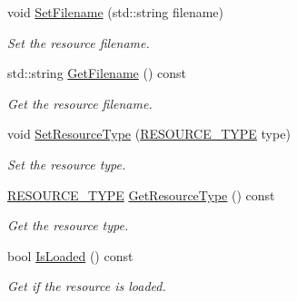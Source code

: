 \begin{DoxyCompactItemize}
void \mbox{\hyperlink{classsfmlbe_1_1_resource_a219b033dc969ca0860bf7402da27107d}{Set\+Filename}} (std\+::string filename)
\begin{DoxyCompactList}\small\item\em Set the resource filename. \end{DoxyCompactList}\item 
std\+::string \mbox{\hyperlink{classsfmlbe_1_1_resource_ae76151a96999e65307a625d1b57cdc80}{Get\+Filename}} () const
\begin{DoxyCompactList}\small\item\em Get the resource filename. \end{DoxyCompactList}\item 
void \mbox{\hyperlink{classsfmlbe_1_1_resource_a6d4c41250bf66f2fe81d4a53d867c4ed}{Set\+Resource\+Type}} (\mbox{\hyperlink{namespacesfmlbe_ac4335ed3060bba025f73e01f9dccb2dd}{R\+E\+S\+O\+U\+R\+C\+E\+\_\+\+T\+Y\+PE}} type)
\begin{DoxyCompactList}\small\item\em Set the resource type. \end{DoxyCompactList}\item 
\mbox{\hyperlink{namespacesfmlbe_ac4335ed3060bba025f73e01f9dccb2dd}{R\+E\+S\+O\+U\+R\+C\+E\+\_\+\+T\+Y\+PE}} \mbox{\hyperlink{classsfmlbe_1_1_resource_a8e0ab17344e90a3c1175a8aa87a96c35}{Get\+Resource\+Type}} () const
\begin{DoxyCompactList}\small\item\em Get the resource type. \end{DoxyCompactList}\item 
bool \mbox{\hyperlink{classsfmlbe_1_1_resource_acd0812c81f7d5d851a4671f0cf7bb4f1}{Is\+Loaded}} () const
\begin{DoxyCompactList}\small\item\em Get if the resource is loaded. \end{DoxyCompactList}\end{DoxyCompactItemize}
